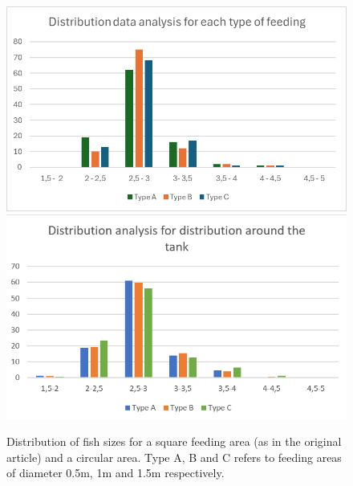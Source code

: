 \documentclass[9pt]{pnas-new}
\begin{document}
\begin{figure}[h]
    \centering
    \includegraphics[width=(2in+\columnwidth)/3]{fig/graph_square.png}
    \hfill
    \includegraphics[width=(2in+\columnwidth)/3]{fig/graph_circle.png}
    \caption{Distribution of fish sizes for a square feeding area (as in the original article) and a circular area. Type A, B and C refers to feeding areas of diameter 0.5m, 1m and 1.5m respectively.}
    \label{fig:results}
\end{figure}
\end{document}

